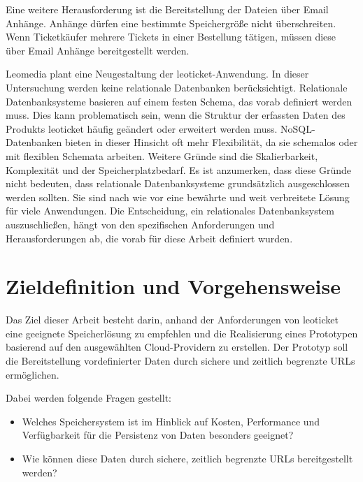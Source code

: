 Eine weitere Herausforderung ist die Bereitstellung der Dateien über Email Anhänge. Anhänge dürfen eine bestimmte Speichergröße nicht überschreiten. Wenn Ticketkäufer mehrere Tickets in einer Bestellung tätigen, müssen diese über Email Anhänge bereitgestellt werden.\\

\newpage

Leomedia plant eine Neugestaltung der leoticket-Anwendung. In dieser Untersuchung werden keine relationale Datenbanken berücksichtigt. Relationale Datenbanksysteme basieren auf einem festen Schema, das vorab definiert werden muss. Dies kann problematisch sein, wenn die Struktur der erfassten Daten des Produkts leoticket häufig geändert oder erweitert werden muss. NoSQL-Datenbanken bieten in dieser Hinsicht oft mehr Flexibilität, da sie schemalos oder mit flexiblen Schemata arbeiten. Weitere Gründe sind die Skalierbarkeit, Komplexität und der Speicherplatzbedarf. Es ist anzumerken, dass diese Gründe nicht bedeuten, dass relationale Datenbanksysteme grundsätzlich ausgeschlossen werden sollten. Sie sind nach wie vor eine bewährte und weit verbreitete Lösung für viele Anwendungen. Die Entscheidung, ein relationales Datenbanksystem auszuschließen, hängt von den spezifischen Anforderungen und Herausforderungen ab, die vorab für diese Arbeit definiert wurden.

\newpage

\section{Zieldefinition und Vorgehensweise}

Das Ziel dieser Arbeit besteht darin, anhand der Anforderungen von leoticket eine geeignete Speicherlösung zu empfehlen und die Realisierung eines Prototypen basierend auf den ausgewählten Cloud-Providern zu erstellen. Der Prototyp soll die Bereitstellung vordefinierter Daten durch sichere und zeitlich begrenzte URLs ermöglichen. 

Dabei werden folgende Fragen gestellt:

\begin{itemize}
	\item Welches Speichersystem ist im Hinblick auf Kosten, Performance und Verfügbarkeit für die Persistenz von Daten besonders geeignet? 
	\item Wie können diese Daten durch sichere, zeitlich begrenzte URLs bereitgestellt werden?
\end{itemize}

